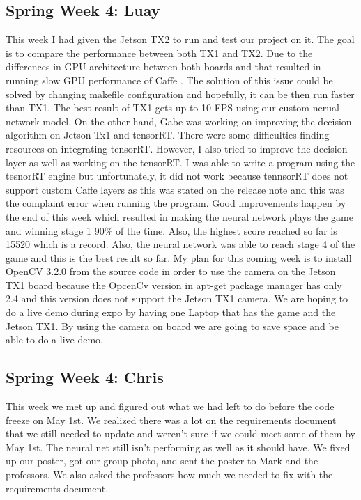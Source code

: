 \documentclass[onecolumn, draftclsnofoot,10pt, compsoc]{IEEEtran}
\begin{document}
\subsection{Spring Week 4: Luay}
This week I had given the Jetson TX2 to run and test our project on it. The goal is to compare the performance between both TX1 and TX2. Due to the differences in GPU architecture between both boards and that resulted in running slow GPU performance of Caffe . The solution of this issue could be solved by changing makefile configuration and hopefully, it can be then run faster than TX1. The best result of TX1 gets up to 10 FPS using our custom nerual network model. On the other hand, Gabe was working on improving the decision algorithm on Jetson Tx1 and tensorRT. There were some difficulties finding resources on integrating tensorRT. However, I also tried to improve the decision layer as well as working on the tensorRT. I was able to write a program using the tesnorRT engine but unfortunately, it did not work because tennsorRT does not support custom Caffe layers as this was stated on the release note and this was the complaint error when running the program.
\newline\newline
Good improvements happen by the end of this week which resulted in making the neural network plays the game and winning stage 1 90\% of the time. Also, the highest score reached so far is 15520 which is a record. Also, the neural network was able to reach stage 4 of the game and this is the best result so far.
\newline\newline
My plan for this coming week is to install OpenCV 3.2.0 from the source code in order to use the camera on the Jetson TX1 board because the OpcenCv version in apt-get package manager has only 2.4 and this version does not support the Jetson TX1 camera. We are hoping to do a live demo during expo by having one Laptop that has the game and the Jetson TX1. By using the camera on board we are going to save space and be able to do a live demo.
\subsection{Spring Week 4: Chris}
This week we met up and figured out what we had left to do before the code freeze on May 1st. We realized there was a lot on the requirements document that we still needed to update and weren't sure if we could meet some of them by May 1st. The neural net still isn't performing as well as it should have. We fixed up our poster, got our group photo, and sent the poster to Mark and the professors. We also asked the professors how much we needed to fix with the requirements document.
\end{document}
